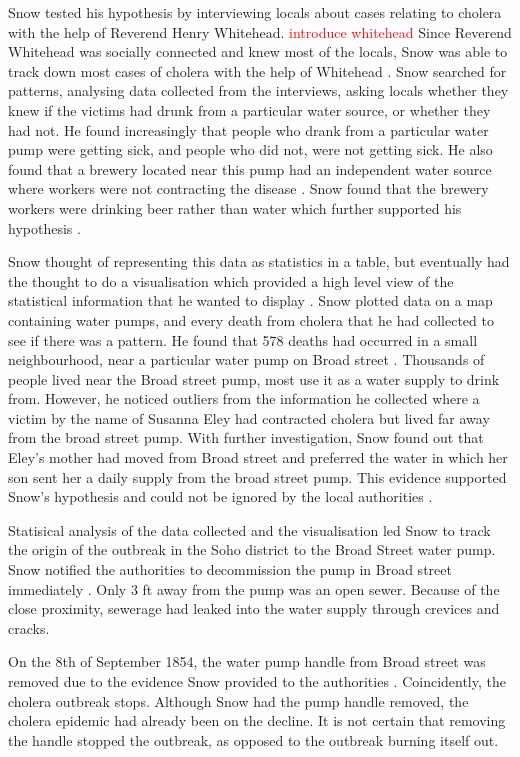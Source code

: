 \documentclass[12pt]{article}
\newcommand\todo[1]{\textcolor{red}{#1}}
\begin{document}
Snow tested his hypothesis by interviewing locals about cases relating to cholera with the help of Reverend Henry Whitehead. \todo{introduce whitehead} Since Reverend Whitehead was socially connected and knew most of the locals, Snow was able to track down most cases of cholera with the help of Whitehead \cite{tedtalk}. Snow searched for patterns, analysing data collected from the interviews, asking locals whether they knew if the victims had drunk from a particular water source, or whether they had not. He found increasingly that people who drank from a particular water pump were getting sick, and people who did not, were not getting sick. He also found that a brewery located near this pump had an independent water source where workers were not contracting the disease \cite{blog}. Snow found that the brewery workers were drinking beer rather than water which further supported his hypothesis \cite{youtube}.

Snow thought of representing this data as statistics in a table, but eventually had the thought to do a visualisation which provided a high level view of the statistical information that he wanted to display \cite{tedtalk}. Snow plotted data on a map containing water pumps, and every death from cholera that he had collected to see if there was a pattern. He found that 578 deaths had occurred in a small neighbourhood, near a particular water pump on Broad street \cite{channel1}. Thousands of people lived near the Broad street pump, most use it as a water supply to drink from. However, he noticed outliers from the information he collected where a victim by the name of Susanna Eley had contracted cholera but lived far away from the broad street pump. With further investigation, Snow found out that Eley's mother had moved from Broad street and preferred the water in which her son sent her a daily supply from the broad street pump. This evidence supported Snow's hypothesis and could not be ignored by the local authorities \cite{channel1}. 

Statisical analysis of the data collected and the visualisation led Snow to track the origin of the outbreak in the Soho district to the Broad Street water pump. Snow notified the authorities to decommission the pump in Broad street immediately \cite{test}. Only 3 ft away from the pump was an open sewer. Because of the close proximity, sewerage had leaked into the water supply through crevices and cracks. 

On the 8th of September 1854, the water pump handle from Broad street was removed due to the evidence Snow provided to the authorities \cite{youtube}. Coincidently, the cholera outbreak stops. Although Snow had the pump handle removed, the cholera epidemic had already been on the decline. It is not certain that removing the handle stopped the outbreak, as opposed to the outbreak burning itself out. 
\end{document}
